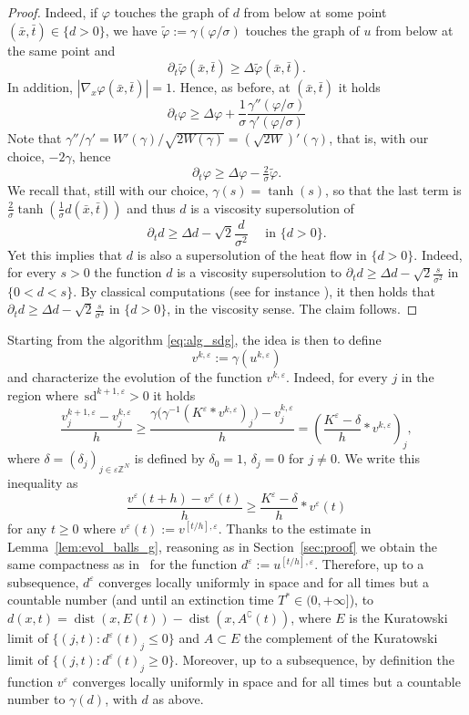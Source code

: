 \documentclass[10pt]{amsart}
\theoremstyle{plain}
\theoremstyle{definition}
\newcommand{\Z}{\mathbb{Z}}
\newcommand{\g}{\gamma}
\newcommand{\comp}[1]{{#1}^\complement}
\DeclareMathOperator{\dist}{dist}
\newcommand{\e}{\varepsilon}
\newcommand{\sd}{\,\mathrm{sd}}
\numberwithin{equation}{section}
\begin{document}
\begin{proof}
Indeed, if $\varphi$ touches the graph
of $d$ from below at some point $(\bar x,\bar t)\in\{ d>0 \}$,
we have $\tilde\varphi:=\gamma(\varphi/\sigma)$ touches
the graph of $u$ from below at the same point and
\[
\partial_t\tilde\varphi(\bar x,\bar t)\ge \Delta\tilde\varphi(\bar x,\bar t).
\]
In addition,  $|\nabla_x\varphi(\bar x,\bar t)|=1$.
Hence, as before, at $(\bar x,\bar t)$ it holds 
\[
 \partial_t \varphi \ge \Delta \varphi + \frac{1}{\sigma}\frac{\gamma''(\varphi/\sigma)}{\gamma'(\varphi/\sigma)}
\]
Note that $\gamma''/\gamma' = W'(\gamma)/\sqrt{2W(\gamma)}
= (\sqrt{2W})'(\gamma)$, that is, with our choice, 
$-2\gamma$, hence
\[
\partial_t \varphi \ge \Delta \varphi - \tfrac{2}{\sigma}\tilde\varphi.
\]
We recall that, still with our choice, $\gamma(s) = \tanh(s )$, so that the last term
is $\frac{2}{\sigma}\tanh(\tfrac{1}{\sigma} d(\bar x,\bar t))$
and thus  $d$ is a   {viscosity} supersolution of
\[
\partial_t d\ge \Delta d - \sqrt{2}\frac{d}{\sigma^2} \quad \text{ in }\{d>0\}.
\]
Yet this implies that $d$ is also a supersolution of the
heat flow in $\{d>0\}$.   {Indeed, for every $s>0$ the function $d$ is a viscosity supersolution to $\partial_t d\ge \Delta d - \sqrt{2}\frac{s}{\sigma^2}$ in $\{0<d<s\}$. By classical computations (see for instance \cite[p.~366]{Soner93}), it then holds that $\partial_t d\ge \Delta d - \sqrt{2}\frac{s}{\sigma^2}$ in $\{d>0\}$, in the viscosity sense.} 
The claim follows.
\end{proof}
 


Starting from the algorithm \eqref{eq:alg_sdg}, the idea is then to define 
\[
v^{k,\e}:=\g(u^{k,\e})
\]
and characterize the  evolution of the function $v^{k,\e}$. Indeed, for every $j$ in the region where $\sd^{k+1,\e}>0$ it holds  
\[
  \frac{v^{k+1,\e}_j-v^{k,\e}_j}{h} \ge \frac{\g\Big( \g^{-1} ( K^\e \ast v^{k,\e})_j\Big)-v^{k,\e}_j}{h}    = \left(\frac{K^\e- \delta}{h}*v^{k,\e}\right)_j,
\]
where $\delta = (\delta_j)_{j\in\e\Z^N}$ is defined by $\delta_0=1$,
$\delta_j=0$ for $j\neq 0$. We write this inequality as
\[
  \frac{v^{\e}(t+h)-v^{\e}(t)}{h} \ge \frac{K^\e- \delta}{h}*v^{\e}(t)
\]
for any $t\ge 0$ where $v^\e(t) := v^{[t/h],\e}$.
Thanks to the estimate in Lemma~\ref{lem:evol_balls_g},  reasoning as in  Section~\ref{sec:proof} we obtain the same compactness
as in~\cite[Prop.~4.4]{CMP17} for the function $d^\e:=u^{[t/h],\e}$. Therefore, up to a subsequence,  $d^\e$ converges
locally uniformly in space and for all times but a countable number (and until an extinction time $T^*\in (0,+\infty]$), to
$d(x,t)=\dist(x,E(t))-\dist(x,\comp{A}(t))$, where $E$ is the Kuratowski limit of $\{(j,t): d^\e(t)_j\le 0\}$
and ${A}\subset E$ the complement of the Kuratowski limit of $\{(j,t): d^\e(t)_j\ge 0\}$. Moreover, up to a subsequence, by definition the function $v^\e$ converges locally uniformly in space and for all times but a countable number to $\g(d)$, with $d$ as above.
\end{document}
